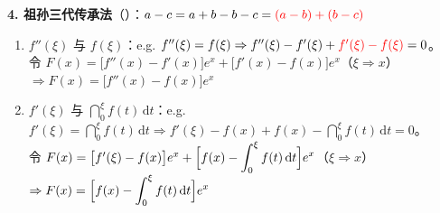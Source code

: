 \documentclass[a4paper,12pt]{article}
\begin{document}
    \begin{minipage}[t]{0.46\textwidth}
        \textbf{4. 祖孙三代传承法}（{\color{red}{经典}}）：$a - c = a + b - b - c = {\color{red}{(a - b) + (b - c)}}$
        \begin{enumerate}[label=\alph*., leftmargin=2em, itemsep=0.8em]
            \item $f''(\xi)$ 与 $f(\xi)$：\quad e.g. $f''(\xi) = f(\xi) \Rightarrow f''(\xi) - f'(\xi) + {\color{red}{f'(\xi) - f(\xi)}} = 0$。\\
                  令 $F(x) = \bigl[f''(x) - f'(x)\bigr]e^{x} + \bigl[f'(x) - f(x)\bigr]e^{x}$（$\xi \Rightarrow x$）$\Rightarrow F(x) = \bigl[f''(x) - f(x)\bigr]e^{x}$
            \item $f'(\xi)$ 与 $\dint_{0}^{\xi} f(t)\,\mathrm{d}t$：\quad e.g. $f'(\xi) = \dint_{0}^{\xi} f(t)\,\mathrm{d}t \Rightarrow f'(\xi) - f(x) + f(x) - \dint_{0}^{\xi} f(t)\,\mathrm{d}t = 0$。\\
                  令 $F(x) = \bigl[f'(\xi) - f(x)\bigr]e^{x} + \Bigl[f(x) - \displaystyle\int_{0}^{\xi} f(t)\,\mathrm{d}t\Bigr]e^{x}$（$\xi \Rightarrow x$）$\Rightarrow F(x) = \Bigl[f(x) - \displaystyle\int_{0}^{\xi} f(t)\,\mathrm{d}t\Bigr]e^{x}$
        \end{enumerate}

        \vspace{0.8em}


\end{minipage}
\end{document}
